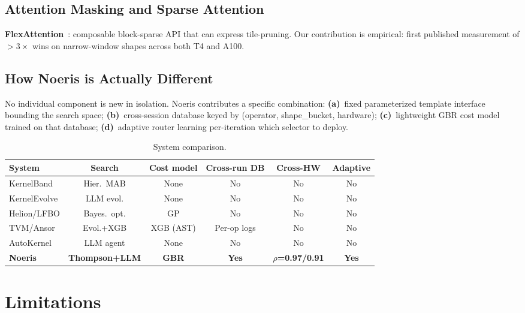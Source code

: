 \documentclass[11pt]{article}
\begin{document}
\subsection{Attention Masking and Sparse Attention}
\label{sec:rw-attention}

\textbf{FlexAttention}~\citep{flexattention}: composable block-sparse API that
can express tile-pruning. Our contribution is empirical: first published
measurement of ${>}3\times$ wins on narrow-window shapes across both T4 and A100.

\subsection{How Noeris is Actually Different}
\label{sec:rw-diff}

No individual component is new in isolation. Noeris contributes a specific
combination: \textbf{(a)}~fixed parameterized template interface bounding the
search space; \textbf{(b)}~cross-session database keyed by (operator,
shape\_bucket, hardware); \textbf{(c)}~lightweight GBR cost model trained on that
database; \textbf{(d)}~adaptive router learning per-iteration which selector to
deploy.

\begin{table}[t]
\centering
\caption{System comparison.}
\label{tab:comparison}
\small
\begin{tabular}{@{}lccccc@{}}
\toprule
System & Search & Cost model & Cross-run DB & Cross-HW & Adaptive \\
\midrule
KernelBand & Hier.\ MAB & None & No & No & No \\
KernelEvolve & LLM evol. & None & No & No & No \\
Helion/LFBO & Bayes.\ opt. & GP & No & No & No \\
TVM/Ansor & Evol.+XGB & XGB (AST) & Per-op logs & No & No \\
AutoKernel & LLM agent & None & No & No & No \\
\textbf{Noeris} & \textbf{Thompson+LLM} & \textbf{GBR} & \textbf{Yes} & \textbf{$\rho$=0.97/0.91} & \textbf{Yes} \\
\bottomrule
\end{tabular}
\end{table}


\section{Limitations}
\label{sec:limitations}
\end{document}
